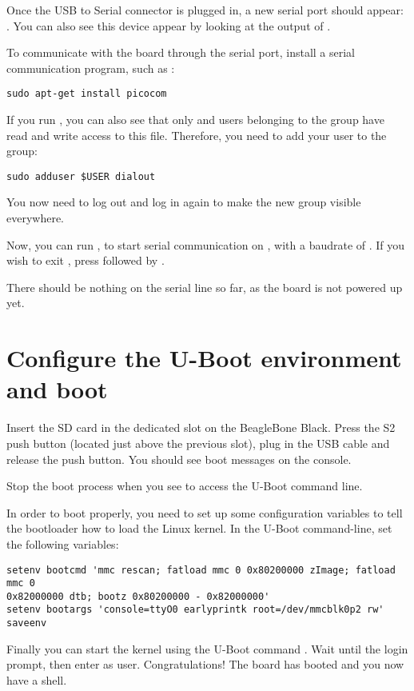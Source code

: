 Once the USB to Serial connector is plugged in, a new serial port
should appear: .  You can also see this device
appear by looking at the output of .

To communicate with the board through the serial port, install a
serial communication program, such as :

\begin{verbatim}
sudo apt-get install picocom
\end{verbatim}

If you run , you can also see that only
 and users belonging to the  group have
read and write access to this file. Therefore, you need to add your user
to the  group:

\begin{verbatim}
sudo adduser $USER dialout
\end{verbatim}

You now need to log out and log in again to make the new group
visible everywhere.

Now, you can run , to start serial
communication on , with a baudrate of . If
you wish to exit , press \code{[Ctrl][a]} followed by
\code{[Ctrl][x]}.

There should be nothing on the serial line so far, as the board is not
powered up yet.

\section{Configure the U-Boot environment and boot}

Insert the SD card in the dedicated slot on the BeagleBone Black. Press the S2
push button (located just above the previous slot), plug in the USB cable and
release the push button. You should see boot messages on the console.

Stop the boot process when you see  to access
the U-Boot command line.

In order to boot properly, you need to set up some configuration variables to
tell the bootloader how to load the Linux kernel. In the U-Boot command-line,
set the following variables:
\begin{verbatim}
setenv bootcmd 'mmc rescan; fatload mmc 0 0x80200000 zImage; fatload mmc 0
0x82000000 dtb; bootz 0x80200000 - 0x82000000'
setenv bootargs 'console=ttyO0 earlyprintk root=/dev/mmcblk0p2 rw'
saveenv
\end{verbatim}

Finally you can start the kernel using the U-Boot command . Wait
until the login prompt, then enter  as user. Congratulations! The
board has booted and you now have a shell.
